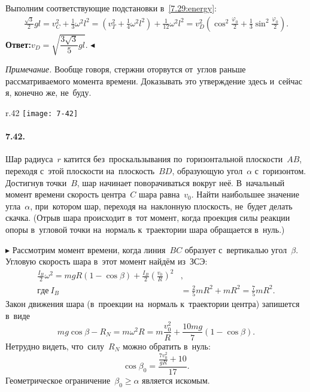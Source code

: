 \documentclass{weekly}
\begin{document}
Выполним соответствующие подстановки в~\eqref{7.29:energy}:
\begin{gather}
    \frac{\sqrt{3}}{2} gl = v_C^2 + \frac{1}{3} \omega^2 l^2
        = \left(v_T^2 + \frac{1}{4} \omega^2 l^2\right)
            + \frac{1}{12} \omega^2 l^2
        = v_D^2 \left(\cos^2\frac{\varphi_0}{2}
            + \frac{1}{3} \sin^2\frac{\varphi_0}{2}\right).
\end{gather}
\textbf{Ответ:}\qquad $v_D = \sqrt{\dfrac{3\sqrt{3}}{5} gl}$.
\hfill $\blacktriangleleft$

\bigskip
\begin{small}
\textsl{Примечание.} Вообще говоря, стержни оторвутся от~углов
раньше рассматриваемого момента времени.
Доказывать это утверждение здесь и~сейчас я, конечно же, не~буду.
\end{small}


\begin{wrapfigure}[6]{r}{.42\textwidth}
\texttt{[image: 7-42]}
\end{wrapfigure}
\paragraph{7.42.} Шар радиуса~$r$ катится без~проскальзывания
по~горизонтальной плоскости~$AB$, переходя с~этой плоскости
на~плоскость~$BD$, образующую угол~$\alpha$ с~горизонтом.
Достигнув точки~$B$, шар начинает поворачиваться вокруг неё.
В~начальный момент времени скорость центра~$C$ шара равна~$v_0$.
Найти наибольшее значение угла~$\alpha$, при~котором шар,
переходя на~наклонную плоскость, не~будет делать скачка.
(Отрыв шара происходит в~тот момент, когда проекция силы реакции
опоры в~угловой точки на~нормаль к~траектории шара обращается в~нуль.)

$\blacktriangleright$ Рассмотрим момент времени, когда
линия~$BC$ образует с~вертикалью угол~$\beta$.
Угловую скорость шара в~этот момент найдём из~ЗСЭ:
\begin{align}
    \frac{I_B}{2} \omega^2 = mgR(1-\cos\beta) +
            \frac{I_B}{2} \left(\frac{v_0}{R}\right)^2&, \\
    где~I_B &= \frac{2}{5}mR^2 + mR^2 = \frac{7}{5}mR^2.
\end{align}
Закон движения шара (в~проекции на~нормаль к~траектории центра)
запишется в~виде
\begin{equation}
    mg\cos\beta - R_N = m\omega^2 R
        = m\frac{v_0^2}{R} + \frac{10mg}{7} (1-\cos\beta).
\end{equation}
Нетрудно видеть, что~силу~$R_N$ можно обратить в~нуль:
\begin{equation}
    \cos\beta_0 = \frac{\frac{7v_0^2}{gR} + 10}{17}.
\end{equation}
Геометрическое ограничение~$\beta_0 \geqslant \alpha$
является искомым.
\end{document}
